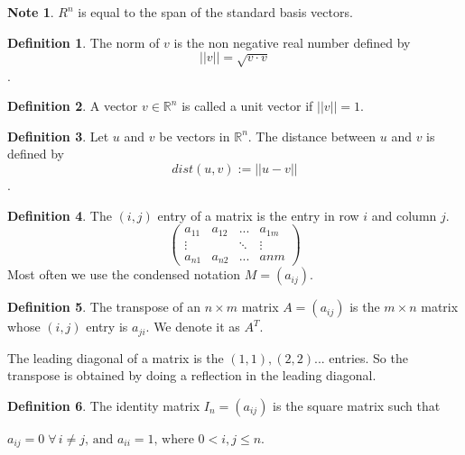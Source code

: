 \documentclass[11pt,a4paper]{article}
\newcommand\R{\mathbb{R}}
\theoremstyle{definition}
\newtheorem{definition}{Definition}
\newtheorem{note}{Note}
\begin{document}
\begin{note}
    $ R^n $ is equal to the span of the standard basis vectors.
\end{note}

\begin{definition}
    The norm of $ v $ is the non negative real number defined by 
    \[ ||v|| = \sqrt{v \cdot v}\].
\end{definition}

\begin{definition}
    A vector $ v \in \R^n $ is called a unit vector if $ ||v|| = 1 $.
\end{definition}

\begin{definition}
    Let $ u $ and $ v $ be vectors in $ \R^n $. The distance between $ u $ and $ v $ is defined by
    \[ dist(u, v) := || u - v ||\].
\end{definition}

\begin{definition}
    The $ (i, j) $ entry of a matrix is the entry in row $ i $ and column $ j $.
    \[\begin{pmatrix}
        a_{11} & a_{12} & ... & a_{1m} \\
        \vdots &        & \ddots & \vdots \\
        a_{n1} & a_{n2}       & ... & a{nm}
    \end{pmatrix}\]
    Most often we use the condensed notation $ M = (a_{ij}) $.
\end{definition}

\begin{definition}
    The transpose of an $ n \times m $ matrix $ A = (a_{ij}) $ is the $ m \times n $ matrix whose $ (i, j) $ entry is $ a_{ji} $. We denote it as $ A^T $.
\end{definition}

The leading diagonal of a matrix is the $ (1, 1), (2,2) ... $ entries. So the transpose is obtained by doing a reflection in the leading diagonal.

\begin{definition}
    The identity matrix $ I_n = (a_{ij}) $ is the square matrix such that 
    
    $ a_{ij} = 0 \; \forall \, i \neq j \text{, and } a_{ii} = 1 \text{, where } 0 < i,j \leq n$.
\end{definition}
\end{document}
